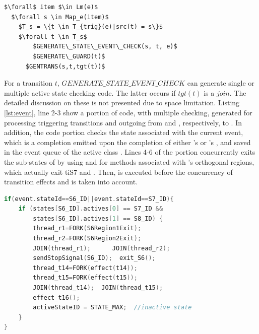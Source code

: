 \begin{lstlisting}[mathescape=true, caption=Generation process for an event, label=lst:eventproc, frame=single]
$\forall$ item $\in Lm(e)$
  $\forall s \in Map_e(item)$
    $T_s = \{t \in T_{trig}(e)|src(t) = s\}$
    $\forall t \in T_s$
	    $GENERATE\_STATE\_EVENT\_CHECK(s, t, e)$
	    $GENERATE\_GUARD(t)$
      $GENTRANS(s,t,tgt(t))$  	
\end{lstlisting}



For a transition $t$, $GENERATE\_STATE\_EVENT\_CHECK$ can generate single or multiple active state checking code. 
The latter occurs if $tgt(t)$ is a $join$. 
The detailed discussion on these is not presented due to space limitation. Listing \ref{lst:event}, line 2-3 show a portion of code, with multiple checking, generated for processing  triggering transitions  and  outgoing from  and , respectively, to . 
In addition, the code portion checks the state associated with the current event, which is a completion emitted upon the completion of either 's or 's , and saved in the event queue of the active class . 
Lines 4-6 of the portion concurrently exits the sub-states of  by using  and  for methods associated with 's orthogonal regions, which actually exit ti{S7} and . Then,  is executed before the concurrency of transition effects  and  is taken into account.



\begin{lstlisting}[caption=Example code generated for completion events triggering transitions t14 and t15, label=lst:event, language=C++,frame=none]
if(event.stateId==S6_ID||event.stateId==S7_ID){
	if (states[S6_ID].actives[0] == S7_ID && 
		states[S6_ID].actives[1] == S8_ID) {
		thread_r1=FORK(S6Region1Exit); 
		thread_r2=FORK(S6Region2Exit);
		JOIN(thread_r1);  	  JOIN(thread_r2);
		sendStopSignal(S6_ID);  exit_S6();
		thread_t14=FORK(effect(t14));  
		thread_t15=FORK(effect(t15));
		JOIN(thread_t14);  JOIN(thread_t15);
		effect_t16();
		activeStateID = STATE_MAX;  //inactive state
	}
}
\end{lstlisting}
  



